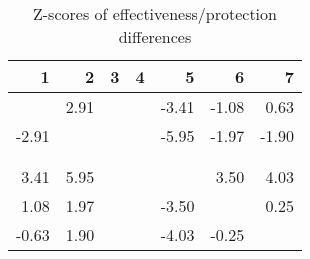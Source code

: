 \begin{table}[ht]
\centering
\begin{tabular}{rrrrrrr}
  \hline
1 & 2 & 3 & 4 & 5 & 6 & 7 \\ 
  \hline
 & 2.91 &  &  & -3.41 & -1.08 & 0.63 \\ 
  -2.91 &  &  &  & -5.95 & -1.97 & -1.90 \\ 
   &  &  &  &  &  &  \\ 
   &  &  &  &  &  &  \\ 
  3.41 & 5.95 &  &  &  & 3.50 & 4.03 \\ 
  1.08 & 1.97 &  &  & -3.50 &  & 0.25 \\ 
  -0.63 & 1.90 &  &  & -4.03 & -0.25 &  \\ 
   \hline
\end{tabular}
\caption{Z-scores of effectiveness/protection differences} 
\end{table}

